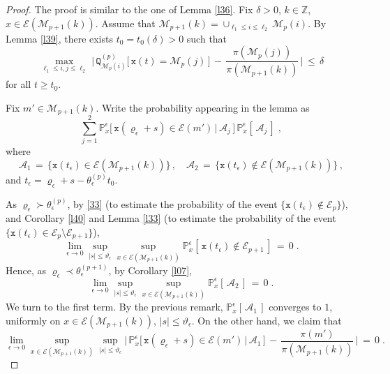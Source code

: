 \documentclass[reqno]{amsart}
\theoremstyle{plain}
\theoremstyle{definition}
\newcommand{\bb}[1]{{\mathbb #1}}
\newcommand{\ms}[1]{{\mathscr #1}}
\newcommand{\mtt}[1]{{\mathtt #1}}
\newcounter{as}[section]
\newcommand{\<}{\langle}
\renewcommand{\>}{\rangle}
\begin{document}
\begin{proof}
The proof is similar to the one of Lemma \ref{l36}. Fix $\delta>0$,
$k\in \bb Z$, $x\in \ms E(\ms M_{p+1}(k))$. Assume that
$\ms M_{p+1}(k) = \cup_{\ell_1 \le i\le \ell_2} \ms M_{p}(i)$. By
Lemma \ref{l39}, there exists $t_{0}=t_{0}(\delta)>0$ such that
\begin{equation*}
\max_{\ell_1 \le i, j\le \ell_2}\,
\Big|\, \mtt Q^{(p)}_{\ms M_p(i)} \big[ \, \mtt x(t) = \ms M_p(j)\, \big]
\,-\, \frac{\pi (\ms M_p(j))}{\pi (\ms M_{p+1}(k))}\,
\Big|\,\le\,\delta 
\end{equation*}
for all $t\ge t_0$.

Fix $m'\in \ms M_{p+1}(k)$.  Write the probability appearing in the
lemma as
\begin{equation*}
\sum_{j=1}^{2} \bb P_x^{\epsilon } \big[\, \mtt x
(\varrho_\epsilon + s) \in \ms E(m')
\,\big|\,\mathscr{A}_{j}\,\big]\,
\bb P_x^{\epsilon } [\,\mathscr{A}_{j}\,]\;,
\end{equation*}
where
\begin{equation*}
\ms A_1 \,=\, \{ \mtt x (t_\epsilon) \in \ms E(\ms M_{p+1}(k)) \}\,,
\quad \ms A_2 \,=\, \{ \mtt x (t_\epsilon) \not \in \ms 
E( \ms M_{p+1}(k)) \}\,, 
\end{equation*}
and $t_{\epsilon}=\varrho_{\epsilon}+s-\theta_{\epsilon}^{(p)} t_{0}$.

As $\varrho_\epsilon \succ \theta_{\epsilon}^{(p)}$, by \eqref{33} (to
estimate the probability of the event
$\{\mtt x (t_\epsilon) \not \in \ms E_p\}$), and Corollary \ref{l40}
and Lemma \ref{l33} (to estimate the probability of the event
$\{\mtt x (t_\epsilon) \in \ms E_p \setminus \ms E_{p+1}\}$),
\begin{equation*}
\lim_{\epsilon\to 0} \sup_{|s|\le \vartheta_\epsilon} \sup_{x\in \ms E(\ms M_{p+1}(k))}
\bb P_x^{\epsilon } [\, \mtt x (t_\epsilon)
\not\in \ms E_{p+1}\,] \,=\, 0\;.
\end{equation*}
Hence, as $\varrho_\epsilon \prec \theta_{\epsilon}^{(p+1)}$, by
Corollary \ref{l07},
\begin{equation*}
\lim_{\epsilon\to 0} \sup_{|s|\le \vartheta_\epsilon} \sup_{x\in \ms E(\ms M_{p+1}(k))}
\bb P_x^{\epsilon } [\,\mathscr{A}_2 \,] \,=\, 0\;.
\end{equation*}
We turn to the first term. By the previous remark,
$\bb P_x^{\epsilon } [\,\mathscr{A}_1 \,]$ converges to $1$, uniformly
on $x\in \ms E(\ms M_{p+1}(k))$, $|s|\le \vartheta_\epsilon$. On the
other hand, we claim that
\begin{equation*}
\lim_{\epsilon\to 0} \sup_{x\in \ms E(\ms M_{p+1}(k))}
\sup_{|s|\le \vartheta_\epsilon}
\Big|\, \bb P_x^{\epsilon } \big[\, \mtt x
(\varrho_\epsilon + s) \in \ms E(m')
\,\big|\,\mathscr{A}_1 \,\big]
\,-\, \frac{\pi(m')}{\pi(\ms M_{p+1}(k))} \,\Big| \,=\, 0\;.
\end{equation*}


\end{proof}
\end{document}
